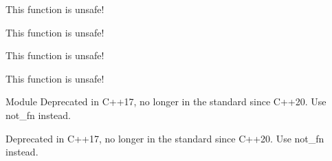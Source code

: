 \begin{DoxyRefList}
\label{deprecated__deprecated000020}%
%
This function is unsafe! 

\label{deprecated__deprecated000036}%
%
This function is unsafe! 

\label{deprecated__deprecated000016}%
%
This function is unsafe! 

\label{deprecated__deprecated000046}%
%
This function is unsafe!  
\item[Module \doxylink{group__negators}{negators} ]\label{deprecated__deprecated000041}%
%
Deprecated in C++17, no longer in the standard since C++20. Use {\ttfamily not\+\_\+fn} instead.

\label{deprecated__deprecated000011}%
%
Deprecated in C++17, no longer in the standard since C++20. Use {\ttfamily not\+\_\+fn} instead.


\end{DoxyRefList}
